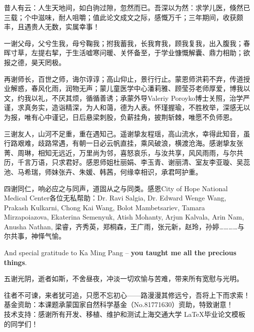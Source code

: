 \begin{thanks}
  昔人有云：人生天地间，如白驹过隙，忽然而已。吾深以为然：求学儿医，倏然已三载；个中滋味，耐人咀嚼；值此论文成文之际，感慨万千；三年期间，收获颇丰，且遇贵人无数，实属幸事！

  一谢父母，父兮生我，母兮鞠我；拊我蓄我，长我育我，顾我复我，出入腹我；春晖寸草，左提右挈，于生活嘘寒问暖、关怀备至，于学业慷慨解囊、鼎力相助；欲报之德，昊天罔极。

  再谢师长，百世之师，诲尔谆谆；高山仰止，景行行止。蒙恩师洪莉不弃，传道授业解惑，春风化雨，润物无声；蒙儿童医学中心潘莉雅、顾莹芬老师厚爱，博我以文，约我以礼，不厌其烦，循循善诱；承蒙外导Valeriy Poroyko博士关照，治学严谨，求真务实，造诣精深，为人和蔼，德为人表。怀瑾握瑜，不胜枚举，深感无以为报，唯有心中谨记，日后悬梁刺股，负薪挂角，披荆斩棘，唯愿不负师恩。

  三谢友人，山河不足重，重在遇知己。遥谢挚友程瑶，高山流水，幸得此知音，虽行路艰难，歧路常遇，有朝一日必云帆直挂，乘风破浪，横渡沧海。感谢挚友张菁、周琳，相知无远近，万里尚为邻，喜怒哀乐，与汝共享，风风雨雨，与尔共历，千言万语，只求君好。感恩师姐杜丽娟、李玉青、谢丽清、室友李亚璇、吴蕊池、马希瑞，师妹张卉、朱媛、韩茜，何缘幸相识，承君呵护重。

  四谢同仁，响必应之与同声，道固从之与同类。感恩City of Hope National Medical Center各位无私帮助：Dr. Ravi Salgia, Dr. Edward Wenge Wang, Prakash Kulkarni, Chong Kai Wang, Bolot Mambetsariev, Tamara Mirzapoiazova, Ekaterina Semenyuk, Atish Mohanty, Arjun Kalvala, Arin Nam, Anusha Nathan, 梁睿，齐秀英，郑桐森，王广雨，张元新，赵玲，孙婷…………与尔共事，神怿气愉。

  And special gratitude to Ka Ming Pang –  \textbf{you taught me all the precious things}.

  五谢光阴，逝者如斯，不舍昼夜，冲淡一切欢愉与苦难，带来所有宽慰与光明。

  往者不可谏，来者犹可追，只愿不忘初心——路漫漫其修远兮，吾将上下而求索！\\
  基金资助：本课题承蒙国家自然科学基金（No.81771630）资助，特致谢意！\\
  技术支持：感谢所有开发、移植、维护和测试上海交通大学 \LaTeX 毕业论文模板的同学们！\\
\end{thanks}
